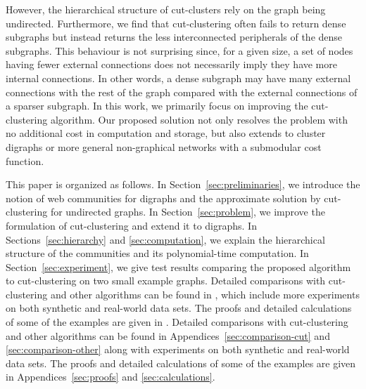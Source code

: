 However, the hierarchical structure of cut-clusters rely on the graph being undirected. Furthermore,
we find that cut-clustering often fails to return dense subgraphs but instead returns the less
interconnected peripherals of the dense subgraphs. This behaviour is not surprising since, for a given
size, a set of nodes having fewer external connections does not necessarily imply they have more
internal connections. In other words, a dense subgraph may have many external connections
with the rest of the graph compared with the external connections of a sparser subgraph.
In this work, we primarily focus on improving the cut-clustering algorithm. Our proposed solution
not only resolves the problem with no additional cost in computation and storage, but also
extends to cluster digraphs or more general non-graphical networks with a submodular cost
function. 

This paper is organized as follows. In Section~\ref{sec:preliminaries}, we introduce the notion of
web communities for digraphs and the approximate solution by cut-clustering for undirected graphs.
In Section~\ref{sec:problem}, we improve the formulation of cut-clustering and extend it to
digraphs. In  Sections~\ref{sec:hierarchy} and \ref{sec:computation}, we explain the hierarchical
structure of the communities and its polynomial-time computation. In Section~\ref{sec:experiment},
we give test results comparing the proposed algorithm to cut-clustering on two small example
graphs.
\ifPAGELIMIT
Detailed comparisons with cut-clustering and other algorithms can be found in \cite[Appendices~A and B]{long}, which include more experiments on both synthetic and real-world data sets. The proofs and detailed calculations of some of the examples are given in \cite[Appendices~C and D]{long}.
\else Detailed comparisons with cut-clustering and other algorithms can be found in Appendices~\ref{sec:comparison-cut} and \ref{sec:comparison-other} along with experiments on both synthetic and real-world data sets. The proofs and detailed calculations of some of the examples are given in Appendices~\ref{sec:proofs} and \ref{sec:calculations}.
\fi